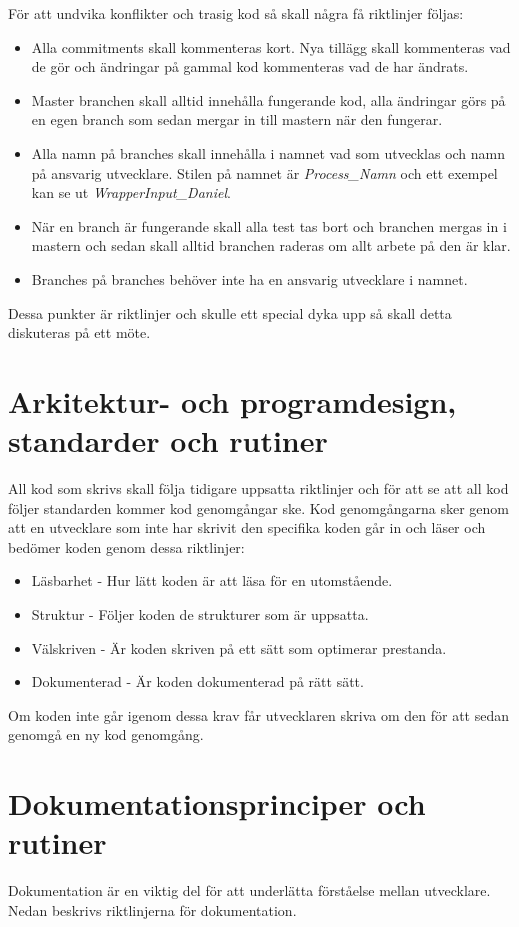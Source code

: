 \documentclass[a4paper,12pt,oneside,final]{extbook}
\begin{document}
För att undvika konflikter och trasig kod så skall några få riktlinjer följas:
\begin{itemize}
	\item Alla commitments skall kommenteras kort. Nya tillägg skall kommenteras vad de gör och ändringar på gammal kod kommenteras vad de har ändrats. 
	\item Master branchen skall alltid innehålla fungerande kod, alla ändringar görs på en egen branch som sedan mergar in till mastern när den fungerar.
	\item Alla namn på branches skall innehålla i namnet vad som utvecklas och namn på ansvarig utvecklare. Stilen på namnet är \textit{Process\_Namn} och ett exempel kan se ut \textit{WrapperInput\_Daniel}.
	\item När en branch är fungerande skall alla test tas bort och branchen mergas in i mastern och sedan skall alltid branchen raderas om allt arbete på den är klar.
	\item Branches på branches behöver inte ha en ansvarig utvecklare i namnet. 
\end{itemize}

Dessa punkter är riktlinjer och skulle ett special dyka upp så skall detta diskuteras på ett möte.


\section{Arkitektur- och programdesign, standarder och rutiner}
All kod som skrivs skall följa tidigare uppsatta riktlinjer och för att se att all kod följer standarden kommer kod genomgångar ske. Kod genomgångarna sker genom att en utvecklare som inte har skrivit den specifika koden går in och läser och bedömer koden genom dessa riktlinjer:
  \begin{itemize}
  	\item Läsbarhet - Hur lätt koden är att läsa för en utomstående.
  	\item Struktur - Följer koden de strukturer som är uppsatta.
  	\item Välskriven - Är koden skriven på ett sätt som optimerar prestanda.
  	\item Dokumenterad - Är koden dokumenterad på rätt sätt.
  \end{itemize}
Om koden inte går igenom dessa krav får utvecklaren skriva om den för att sedan genomgå en ny kod genomgång.
\section{Dokumentationsprinciper och rutiner}
Dokumentation är en viktig del för att underlätta förståelse mellan utvecklare. Nedan beskrivs riktlinjerna för dokumentation.
\end{document}
